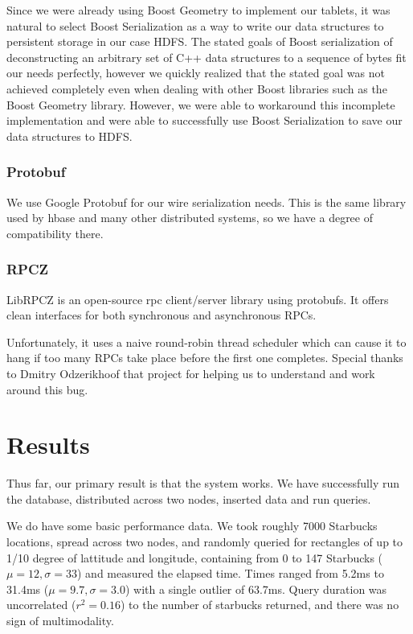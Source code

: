\documentclass[11pt]{article}
\begin{document}
Since we were already using Boost Geometry to implement our tablets, it was natural to select Boost Serialization as a way to write our data structures to persistent storage in our case HDFS. The stated goals of Boost serialization of deconstructing an arbitrary set of C++ data structures to a sequence of bytes fit our needs perfectly, however we quickly realized that the stated goal was not achieved completely even when dealing with other Boost libraries such as the Boost Geometry library. However, we were able to workaround this incomplete implementation and were able to successfully use Boost Serialization to save our data structures to HDFS.

\subsubsection{Protobuf}

We use Google Protobuf for our wire serialization needs. This is the same library used by hbase and many other distributed systems, so we have a degree of compatibility there.

\subsubsection{RPCZ}

LibRPCZ is an open-source rpc client/server library using protobufs. It offers clean interfaces for both synchronous and asynchronous RPCs.

Unfortunately, it uses a naive round-robin thread scheduler which can cause it to hang if too many RPCs take place before the first one completes. Special thanks to Dmitry Odzerikhoof that project for helping us to understand and work around this bug.

\section{Results}

Thus far, our primary result is that the system works.  We have successfully run the database, distributed across two nodes, inserted data and run queries.

We do have some basic performance data.  We took roughly 7000 Starbucks locations, spread across two nodes, and randomly queried for rectangles of up to 1/10 degree of lattitude and longitude, containing from 0 to 147 Starbucks ($\mu=12, \sigma=33$) and measured the elapsed time.  Times ranged from 5.2ms to 31.4ms ($\mu=9.7, \sigma=3.0$) with a single outlier of 63.7ms.  Query duration was uncorrelated ($r^2=0.16$) to the number of starbucks returned, and there was no sign of multimodality.
\end{document}
